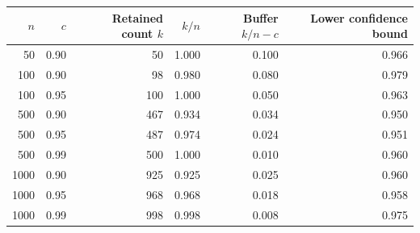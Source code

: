 \begin{tabular}{@{}rrrrrr@{}}
\toprule
\(n\) & \(c\) & Retained count \(k\) & \(k/n\) & Buffer \(k/n-c\) & Lower confidence bound\\
\midrule
50 & 0.90 & 50 & 1.000 & 0.100 & 0.966 \\
100 & 0.90 & 98 & 0.980 & 0.080 & 0.979 \\
100 & 0.95 & 100 & 1.000 & 0.050 & 0.963 \\
500 & 0.90 & 467 & 0.934 & 0.034 & 0.950 \\
500 & 0.95 & 487 & 0.974 & 0.024 & 0.951 \\
500 & 0.99 & 500 & 1.000 & 0.010 & 0.960 \\
1000 & 0.90 & 925 & 0.925 & 0.025 & 0.960 \\
1000 & 0.95 & 968 & 0.968 & 0.018 & 0.958 \\
1000 & 0.99 & 998 & 0.998 & 0.008 & 0.975 \\
\bottomrule
\end{tabular}
